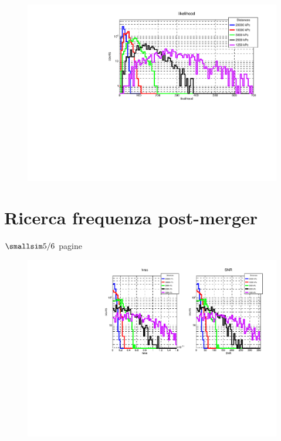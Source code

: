 \begin{center}
	\begin{figure}[H]
		\centering
		\includegraphics[scale=0.8, angle=0]{figures/Capitolo_4/likelihoodDistribution.pdf}
		\setlength{\belowcaptionskip}{-20pt}
		\caption{}
		\label{fig:likelihoodDistribution}
	\end{figure}
\end{center}	

\section{Ricerca frequenza post-merger}
\begin{center}
	$\smallsim 5/6$ pagine
\end{center}

\begin{center}
	\begin{figure}[H]
		\centering
		\includegraphics[scale=0.68, angle=0]{figures/Capitolo_4/hrss_snr_Distribution.pdf}
		\setlength{\belowcaptionskip}{-20pt}
		\caption{}
		\label{fig:hrss_snr_distribution}
	\end{figure}
\end{center}	

\lipsum[8]
\lipsum[9]